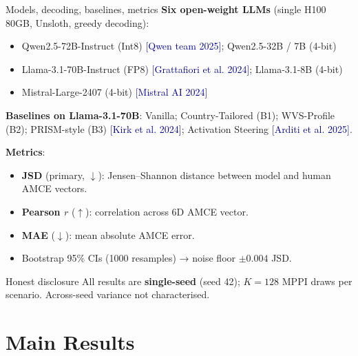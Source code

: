 \documentclass[10pt,aspectratio=169]{beamer}
\newcommand{\cit}[1]{{\scriptsize\textcolor{darkblue}{[#1]}}}
\begin{document}
\begin{frame}{Models, decoding, baselines, metrics}
  \textbf{Six open-weight LLMs} (single H100 80GB, Unsloth, greedy decoding):
  \begin{itemize}\small
    \item Qwen2.5-72B-Instruct (Int8) \cit{Qwen team 2025}; Qwen2.5-32B / 7B (4-bit)
    \item Llama-3.1-70B-Instruct (FP8) \cit{Grattafiori et al. 2024}; Llama-3.1-8B (4-bit)
    \item Mistral-Large-2407 (4-bit) \cit{Mistral AI 2024}
  \end{itemize}
  \textbf{Baselines on Llama-3.1-70B}: Vanilla; Country-Tailored (B1); WVS-Profile (B2); PRISM-style (B3) \cit{Kirk et al. 2024}; Activation Steering \cit{Arditi et al. 2025}.

  \textbf{Metrics}:
  \begin{itemize}\small
    \item \textbf{JSD} (primary, $\downarrow$): Jensen--Shannon distance between model and human AMCE vectors.
    \item \textbf{Pearson $r$} ($\uparrow$): correlation across 6D AMCE vector.
    \item \textbf{MAE} ($\downarrow$): mean absolute AMCE error.
    \item Bootstrap 95\% CIs (1000 resamples) → noise floor $\pm 0.004$ JSD.
  \end{itemize}
  \begin{alertblock}{Honest disclosure}
    All results are \textbf{single-seed} (seed 42); $K=128$ MPPI draws per scenario. Across-seed variance not characterised.
  \end{alertblock}
\end{frame}

\section{Main Results}
\end{document}
